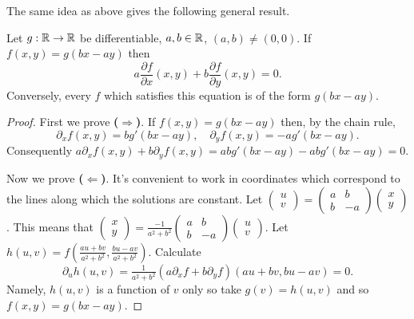 The same idea as above gives the following general result.

\begin{theorem}
    Let \(g:\mathbb{R}\to\mathbb{R}\) be differentiable, \(a,b\in \mathbb{R}\), \((a,b)\neq (0,0)\).
    If \(f(x,y)= g(bx-ay)\) then
    \[
        a \frac{\partial f}{\partial x} (x,y) + b \frac{\partial f}{\partial y} (x,y) = 0.
    \]
    Conversely, every \(f\) which satisfies this equation is of the form \(g(bx-ay)\).
\end{theorem}

\begin{proof}
    First we prove \textbf{(\(\Rightarrow\))}.
    If \(f(x,y)= g(bx-ay)\) then, by the chain rule,
    \[
        \partial_x f(x,y) = bg'(bx-ay),
        \quad
        \partial_y f(x,y) = -ag'(bx-ay).
    \]
    Consequently \(a\partial_x f(x,y) + b \partial_y f(x,y) = a bg'(bx-ay) - abg'(bx-ay) = 0\).

    Now we prove \textbf{(\(\Leftarrow\))}.
    It's convenient to work in coordinates which correspond to the lines along which the solutions are constant.
    Let \(\left(\begin{smallmatrix}
            u\\ v
        \end{smallmatrix}\right)
    = \left(\begin{smallmatrix}
            a & b \\ b & -a
        \end{smallmatrix}\right)
    \left(\begin{smallmatrix}
            x \\ y
        \end{smallmatrix}\right)\).
    This means that
    \(\left(\begin{smallmatrix}
            x\\ y
        \end{smallmatrix}\right)
    = \frac{-1}{a^2 + b^2} \left(\begin{smallmatrix}
            a & b \\ b & -a
        \end{smallmatrix}\right)
    \left(\begin{smallmatrix}
            u \\ v
        \end{smallmatrix}\right)\).
    Let \(h(u,v)=f(\frac{au + bv}{a^2 + b^2}, \frac{bu-av}{a^2+b^2})\).
    Calculate
    \[
        \partial_u h(u,v)
        = \tfrac{1}{{a^2 + b^2}}
        \left( a \partial_x f
        + b \partial_y f \right)  (au + bv, bu-av) = 0.
    \]
    Namely, \(h(u,v)\) is a function of \(v\) only so take \(g(v) = h(u,v)\) and so \(f(x,y) = g(bx-ay)\).
\end{proof}

